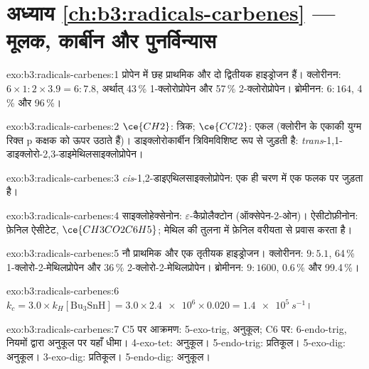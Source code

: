 \section*{अध्याय \ref{ch:b3:radicals-carbenes} --- मूलक, कार्बीन और पुनर्विन्यास}

\begin{solution}{exo:b3:radicals-carbenes:1}
प्रोपेन में छह प्राथमिक और दो द्वितीयक हाइड्रोजन हैं। क्लोरीनन: $6 \times 1 : 2 \times 3.9 = 6 : 7.8$,
अर्थात् 43\,\% 1-क्लोरोप्रोपेन और 57\,\% 2-क्लोरोप्रोपेन। ब्रोमीनन: $6 : 164$, 4\,\% और
96\,\%।
\end{solution}

\begin{solution}{exo:b3:radicals-carbenes:2}
$\ce{CH2}$: त्रिक; $\ce{CCl2}$: एकल (क्लोरीन के एकाकी युग्म रिक्त p कक्षक को ऊपर उठाते हैं)।
डाइक्लोरोकार्बीन त्रिविमविशिष्ट रूप से जुड़ती है: \textit{trans}-1,1-डाइक्लोरो-2,3-डाइमेथिलसाइक्लोप्रोपेन।
\end{solution}

\begin{solution}{exo:b3:radicals-carbenes:3}
\textit{cis}-1,2-डाइएथिलसाइक्लोप्रोपेन:  एक ही चरण में एक फलक पर जुड़ता है।
\end{solution}

\begin{solution}{exo:b3:radicals-carbenes:4}
साइक्लोहेक्सेनोन: $\varepsilon$-कैप्रोलैक्टोन (ऑक्सेपेन-2-ओन)। ऐसीटोफ़ीनोन: फ़ेनिल ऐसीटेट,
$\ce{CH3CO2C6H5}$; मेथिल की तुलना में फ़ेनिल वरीयता से प्रवास करता है।
\end{solution}

\begin{solution}{exo:b3:radicals-carbenes:5}
नौ प्राथमिक और एक तृतीयक हाइड्रोजन। क्लोरीनन: $9 : 5.1$, 64\,\% 1-क्लोरो-2-मेथिलप्रोपेन
और 36\,\% 2-क्लोरो-2-मेथिलप्रोपेन। ब्रोमीनन: $9 : 1600$, 0.6\,\% और 99.4\,\%।
\end{solution}

\begin{solution}{exo:b3:radicals-carbenes:6}
$k_c = 3.0 \times k_H[\mathrm{Bu_3SnH}] = 3.0 \times \num{2.4e6} \times 0.020 = \qty{1.4e5}{s^{-1}}$।
\end{solution}

\begin{solution}{exo:b3:radicals-carbenes:7}
C5 पर आक्रमण: 5-exo-trig, अनुकूल; C6 पर: 6-endo-trig, नियमों द्वारा अनुकूल पर
यहाँ धीमा। 4-exo-tet: अनुकूल। 5-endo-trig: प्रतिकूल। 5-exo-dig: अनुकूल।
3-exo-dig: प्रतिकूल। 5-endo-dig: अनुकूल।
\end{solution}

